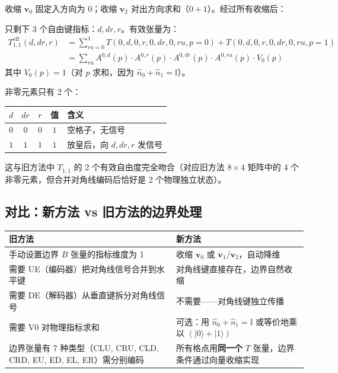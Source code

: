 \documentclass[12pt,a4paper]{article}
\begin{document}
收缩 $\mathbf{v}_0$ 固定入方向为 0；收缩 $\mathbf{v}_2$ 对出方向求和（$0 + 1$）。经过所有收缩后：

\begin{sumbox}[左上角的有效张量]
只剩下 3 个自由键指标：$d, dr, r$。有效张量为：
\begin{align*}
T_{1,1}^{\text{eff}}(d, dr, r) &= \sum_{ru=0}^{1} T(0, d, 0, r, 0, dr, 0, ru, p{=}0) + T(0, d, 0, r, 0, dr, 0, ru, p{=}1) \\
&= \sum_{ru} A^{0,d}(p) \cdot A^{0,r}(p) \cdot A^{0,dr}(p) \cdot A^{0,ru}(p) \cdot V_0(p)
\end{align*}
其中 $V_0(p) = 1$（对 $p$ 求和，因为 $\hat{n}_0 + \hat{n}_1 = \mathbb{I}$）。

\medskip
非零元素只有 2 个：
\begin{center}
\renewcommand{\arraystretch}{1.2}
\begin{tabular}{ccc|c|l}
\toprule
$d$ & $dr$ & $r$ & 值 & 含义 \\
\midrule
$0$ & $0$ & $0$ & $1$ & 空格子，无信号 \\
$1$ & $1$ & $1$ & $1$ & 放皇后，向 $d, dr, r$ 发信号 \\
\bottomrule
\end{tabular}
\end{center}
这与旧方法中 $T_{1,1}$ 的 2 个有效自由度完全吻合（对应旧方法 $8 \times 4$ 矩阵中的 4 个非零元素，但合并对角线编码后恰好是 2 个物理独立状态）。
\end{sumbox}

\subsection{对比：新方法 vs 旧方法的边界处理}

\begin{center}
\renewcommand{\arraystretch}{1.3}
\begin{tabular}{p{5cm}p{5cm}}
\toprule
\textbf{旧方法} & \textbf{新方法} \\
\midrule
手动设置边界 $B$ 张量的指标维度为 1 & 收缩 $\mathbf{v}_0$ 或 $\mathbf{v}_1/\mathbf{v}_2$，自动降维 \\
需要 UE（编码器）把对角线信号合并到水平键 & 对角线键直接存在，边界自然收缩 \\
需要 DE（解码器）从垂直键拆分对角线信号 & 不需要——对角线键独立传播 \\
需要 V0 对物理指标求和 & 可选：用 $\hat{n}_0 + \hat{n}_1 = \mathbb{I}$ 或等价地乘以 $(|0\rangle + |1\rangle)$ \\
边界张量有 7 种类型（CLU, CRU, CLD, CRD, EU, ED, EL, ER）需分别编码 & 所有格点用\textbf{同一个} $T$ 张量，边界条件通过向量收缩实现 \\
\bottomrule
\end{tabular}
\end{center}
\end{document}
